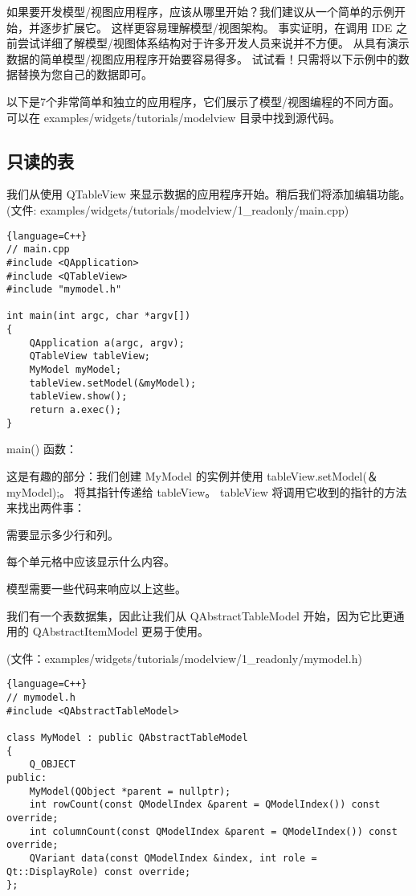 如果要开发模型/视图应用程序，应该从哪里开始？我们建议从一个简单的示例开始，并逐步扩展它。
这样更容易理解模型/视图架构。
事实证明，在调用 IDE 之前尝试详细了解模型/视图体系结构对于许多开发人员来说并不方便。
从具有演示数据的简单模型/视图应用程序开始要容易得多。
试试看！只需将以下示例中的数据替换为您自己的数据即可。

以下是7个非常简单和独立的应用程序，它们展示了模型/视图编程的不同方面。
可以在 examples/widgets/tutorials/modelview 目录中找到源代码。

\subsection{只读的表}

我们从使用 QTableView 来显示数据的应用程序开始。稍后我们将添加编辑功能。
(文件: examples/widgets/tutorials/modelview/1\_readonly/main.cpp)

\begin{lstlisting}{language=C++}
// main.cpp
#include <QApplication>
#include <QTableView>
#include "mymodel.h"
	
int main(int argc, char *argv[])
{
	QApplication a(argc, argv);
	QTableView tableView;
	MyModel myModel;
	tableView.setModel(&myModel);
	tableView.show();
	return a.exec();
}
\end{lstlisting}

main() 函数：

这是有趣的部分：我们创建 MyModel 的实例并使用 tableView.setModel(＆myModel);。 
将其指针传递给 tableView。 tableView 将调用它收到的指针的方法来找出两件事：

\begin{compactitem}
\item 需要显示多少行和列。
\item 每个单元格中应该显示什么内容。
\end{compactitem}

模型需要一些代码来响应以上这些。

我们有一个表数据集，因此让我们从 QAbstractTableModel 开始，因为它比更通用的 QAbstractItemModel 更易于使用。

(文件：examples/widgets/tutorials/modelview/1\_readonly/mymodel.h)

\begin{lstlisting}{language=C++}
// mymodel.h
#include <QAbstractTableModel>
	
class MyModel : public QAbstractTableModel
{
	Q_OBJECT
public:
	MyModel(QObject *parent = nullptr);
	int rowCount(const QModelIndex &parent = QModelIndex()) const override;
	int columnCount(const QModelIndex &parent = QModelIndex()) const override;
	QVariant data(const QModelIndex &index, int role = Qt::DisplayRole) const override;
};
\end{lstlisting}

